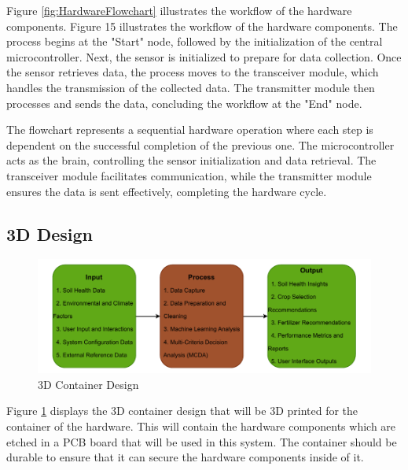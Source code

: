{	Figure \ref{fig:HardwareFlowchart} illustrates the workflow of the hardware components. Figure 15 illustrates the workflow of the hardware components. The process begins at the "Start" node, followed by the initialization of the central microcontroller. Next, the sensor is initialized to prepare for data collection. Once the sensor retrieves data, the process moves to the transceiver module, which handles the transmission of the collected data. The transmitter module then processes and sends the data, concluding the workflow at the "End" node.
	
	The flowchart represents a sequential hardware operation where each step is dependent on the successful completion of the previous one. The microcontroller acts as the brain, controlling the sensor initialization and data retrieval. The transceiver module facilitates communication, while the transmitter module ensures the data is sent effectively, completing the hardware cycle.
	
	\subsection{3D Design}
	\begin{figure}[H]
		\centering
		\caption{3D Container Design}
		\label{fig:3D}
		\includegraphics[width=1\textwidth]{figures/IPO.pdf}
	\end{figure}
	
	Figure \ref{fig:3D} displays the 3D container design that will be 3D printed for the container of the hardware. This will contain the hardware components which are etched in a PCB board that will be used in this system. The container should be durable to ensure that it can secure the hardware components inside of it.
	
}
